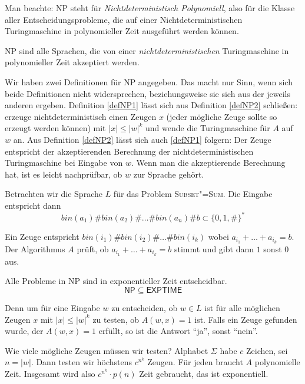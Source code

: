 \begin{Bem}
  \hspace{\parindent}Man beachte: \textsf{NP} steht für \textit{Nichtdeterministisch Polynomiell}, also für die Klasse aller Entscheidungsprobleme, die auf einer Nichtdeterministischen Turingmaschine in polynomieller Zeit ausgeführt werden können.
\end{Bem}

\begin{Def}\label{defNP2}
  \hspace{\parindent}\textsf{NP} sind alle Sprachen, die von einer \textit{nichtdeterministischen} Turingmaschine in polynomieller Zeit akzeptiert werden.
\end{Def}

Wir haben zwei Definitionen für \textsf{NP} angegeben. Das macht nur Sinn, wenn sich beide Definitionen nicht widersprechen, beziehungsweise sie sich aus der jeweils anderen ergeben. Definition \ref{defNP1} lässt sich aus Definition \ref{defNP2} schließen: erzeuge nichtdeterministisch einen Zeugen $x$ (jeder mögliche Zeuge sollte so erzeugt werden können) mit $|x| \le |w|^k$ und wende die Turingmaschine für $A$ auf $w$ an. Aus Definition \ref{defNP2} lässt sich auch \ref{defNP1} folgern: Der Zeuge entspricht der akzeptierenden Berechnung der nichtdeterministischen Turingmaschine bei Eingabe von $w$. Wenn man die akzeptierende Berechnung hat, ist es leicht nachprüfbar, ob $w$ zur Sprache gehört.

\begin{Bsp}
  \hspace{\parindent}Betrachten wir die Sprache $L$ für das Problem \textsc{Subset"=Sum}. Die Eingabe entspricht dann \[ bin(a_1)\#bin(a_2)\#\ldots\#bin(a_n)\#b \subset \{0,1,\#\}^* \]
  
  Ein Zeuge entspricht $bin(i_1)\#bin(i_2)\#\ldots\#bin(i_k)$ wobei $a_{i_1} + \ldots + a_{i_k} = b$. Der Algorithmus $A$ prüft, ob $a_{i_1} + \ldots + a_{i_k} = b$ stimmt und gibt dann $1$ sonst $0$ aus.
\end{Bsp}

\begin{Anm}
  \hspace{\parindent}Alle Probleme in \textsf{NP} sind in exponentieller Zeit entscheidbar.
  \[ \mathsf{NP} \subseteq \mathsf{EXPTIME}\]

  Denn um für eine Eingabe $w$ zu entscheiden, ob $w \in L$ ist für alle möglichen Zeugen $x$ mit $|x|\le |w|^k$ zu testen, ob $A(w,x)=1$ ist. Falls ein Zeuge gefunden wurde, der $A(w,x)=1$ erfüllt, so ist die Antwort "`ja"', sonst "`nein"'.

  Wie viele mögliche Zeugen müssen wir testen? Alphabet $\Sigma$ habe $c$ Zeichen, sei $n=|w|$. Dann testen wir höchstens $c^{n^k}$ Zeugen. Für jeden braucht $A$ polynomielle Zeit. Insgesamt wird also $c^{n^k} \cdot p(n)$ Zeit gebraucht, das ist exponentiell.
\end{Anm}

